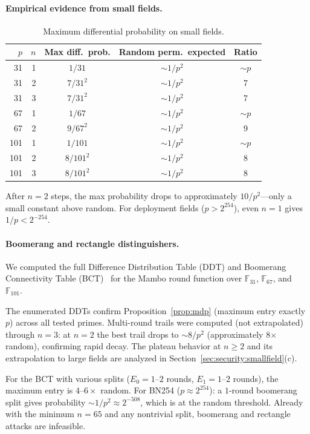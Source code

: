 \documentclass[11pt,a4paper]{article}
\theoremstyle{definition}
\begin{document}
\paragraph{Empirical evidence from small fields.}
\begin{table}[h]
\centering
\caption{Maximum differential probability on small fields.}
\label{tab:mdp_smallfield}
\begin{tabular}{@{}rrccc@{}}
\toprule
$p$ & $n$ & Max diff.\ prob. & Random perm.\ expected & Ratio \\
\midrule
 31 & 1 & $1/31$ & ${\sim}1/p^2$ & ${\sim}p$ \\
 31 & 2 & $7/31^2$ & ${\sim}1/p^2$ & 7 \\
 31 & 3 & $7/31^2$ & ${\sim}1/p^2$ & 7 \\
 67 & 1 & $1/67$ & ${\sim}1/p^2$ & ${\sim}p$ \\
 67 & 2 & $9/67^2$ & ${\sim}1/p^2$ & 9 \\
101 & 1 & $1/101$ & ${\sim}1/p^2$ & ${\sim}p$ \\
101 & 2 & $8/101^2$ & ${\sim}1/p^2$ & 8 \\
101 & 3 & $8/101^2$ & ${\sim}1/p^2$ & 8 \\
\bottomrule
\end{tabular}
\end{table}

After $n=2$ steps, the max probability drops to approximately $10/p^2$---only a small constant above random. For deployment fields ($p > 2^{254}$), even $n=1$ gives $1/p < 2^{-254}$.

\paragraph{Boomerang and rectangle distinguishers.}
We computed the full Difference Distribution Table (DDT) and Boomerang
Connectivity Table (BCT)~\cite{Wagner_Boomerang} for the Mambo round
function over
$\mathbb{F}_{31}$, $\mathbb{F}_{67}$, and~$\mathbb{F}_{101}$.

The enumerated DDTs confirm Proposition~\ref{prop:mdp} (maximum
entry exactly $p$) across all tested primes. Multi-round trails were computed
(not extrapolated) through $n = 3$: at $n = 2$ the best trail drops to
${\sim}8/p^2$ (approximately 8$\times$ random), confirming rapid decay.
The plateau behavior at $n \ge 2$ and its extrapolation to large fields
are analyzed in Section~\ref{sec:security:smallfield}(c).

For the BCT with various splits ($E_0 = 1$--$2$ rounds,
$E_1 = 1$--$2$ rounds), the maximum entry is $4$--$6\times$ random.
For BN254 ($p \approx 2^{254}$): a $1$-round boomerang split gives
probability ${\sim}1/p^2 \approx 2^{-508}$, which is at the random
threshold. Already with the minimum $n = 65$ and any nontrivial
split, boomerang and rectangle attacks are infeasible.
\end{document}
